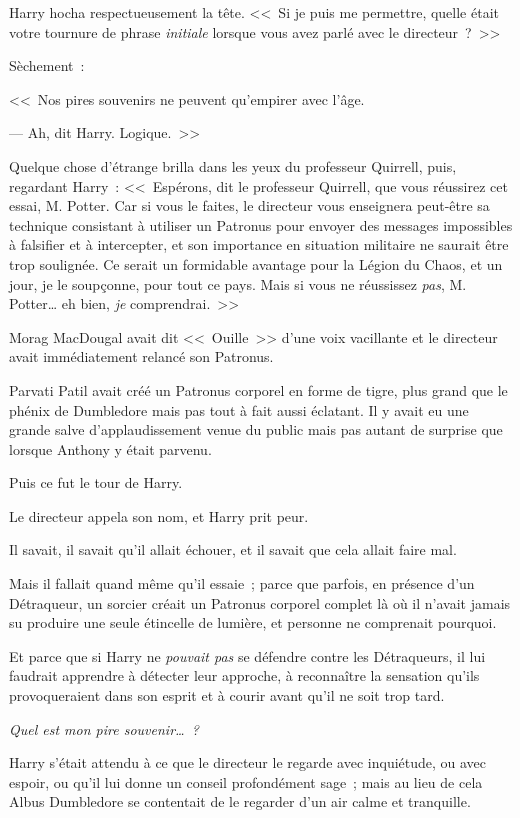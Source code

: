 Harry hocha respectueusement la tête. <<~Si je puis me permettre, quelle était votre tournure de phrase \emph{initiale} lorsque vous avez parlé avec le directeur~?~>>

Sèchement~:

<<~Nos pires souvenirs ne peuvent qu'empirer avec l'âge.

--- Ah, dit Harry. Logique.~>>

Quelque chose d'étrange brilla dans les yeux du professeur Quirrell, puis, regardant Harry~: <<~Espérons, dit le professeur Quirrell, que vous réussirez cet essai, M. Potter. Car si vous le faites, le directeur vous enseignera peut-être sa technique consistant à utiliser un Patronus pour envoyer des messages impossibles à falsifier et à intercepter, et son importance en situation militaire ne saurait être trop soulignée. Ce serait un formidable avantage pour la Légion du Chaos, et un jour, je le soupçonne, pour tout ce pays. Mais si vous ne réussissez \emph{pas}, M. Potter… eh bien, \emph{je} comprendrai.~>>

\later

Morag MacDougal avait dit <<~Ouille~>> d'une voix vacillante et le directeur avait immédiatement relancé son Patronus.

Parvati Patil avait créé un Patronus corporel en forme de tigre, plus grand que le phénix de Dumbledore mais pas tout à fait aussi éclatant. Il y avait eu une grande salve d'applaudissement venue du public mais pas autant de surprise que lorsque Anthony y était parvenu.

Puis ce fut le tour de Harry.

Le directeur appela son nom, et Harry prit peur.

Il savait, il savait qu'il allait échouer, et il savait que cela allait faire mal.

Mais il fallait quand même qu'il essaie~; parce que parfois, en présence d'un Détraqueur, un sorcier créait un Patronus corporel complet là où il n'avait jamais su produire une seule étincelle de lumière, et personne ne comprenait pourquoi.

Et parce que si Harry ne \emph{pouvait pas} se défendre contre les Détraqueurs, il lui faudrait apprendre à détecter leur approche, à reconnaître la sensation qu'ils provoqueraient dans son esprit et à courir avant qu'il ne soit trop tard.

\emph{Quel est mon pire souvenir…~?}

Harry s'était attendu à ce que le directeur le regarde avec inquiétude, ou avec espoir, ou qu'il lui donne un conseil profondément sage~; mais au lieu de cela Albus Dumbledore se contentait de le regarder d'un air calme et tranquille.

